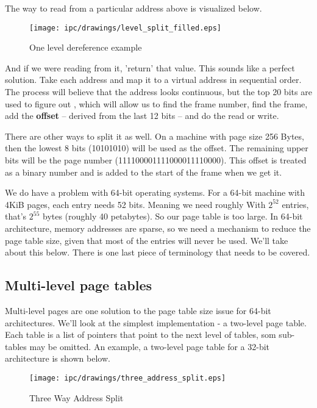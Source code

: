 The way to read from a particular address above is visualized below.
	 
\begin{figure}[H]
	\centering
	\texttt{[image: ipc/drawings/level\_split\_filled.eps]}
	\caption{One level dereference example}
\end{figure}
	 
And if we were reading from it, 'return' that value.
This sounds like a perfect solution.
Take each address and map it to a virtual address in sequential order.
The process will believe that the address looks continuous, but the top 20 bits are used to figure out ,
which will allow us to find the frame number, find the frame, add the \textbf{offset} -- derived from the last 12 bits -- and do the read or write.
	 
There are other ways to split it as well.
On a machine with page size 256 Bytes, then the lowest 8 bits (10101010) will be used as the offset.
The remaining upper bits will be the page number (111100001111000011110000). This offset is treated as a binary number and is added to the start of the frame when we get it.
	 
We do have a problem with 64-bit operating systems.
For a 64-bit machine with 4KiB pages, each entry needs 52 bits.
Meaning we need roughly
With $2^{52}$ entries, that's $2^{55}$ bytes (roughly 40 petabytes).
So our page table is too large.
In 64-bit architecture, memory addresses are sparse, so we need a mechanism to reduce the page table size, given that most of the entries will never be used.
We'll take about this below. There is one last piece of terminology that needs to be covered.
	 
\subsection{Multi-level page tables}
	 
Multi-level pages are one solution to the page table size issue for 64-bit architectures.
We'll look at the simplest implementation - a two-level page table.
Each table is a list of pointers that point to the next level of tables, som sub-tables may be omitted.
An example, a two-level page table for a 32-bit architecture is shown below.
	 
\begin{figure}[H]
	\centering
	\texttt{[image: ipc/drawings/three\_address\_split.eps]}
	\caption{Three Way Address Split}
\end{figure}
	 
